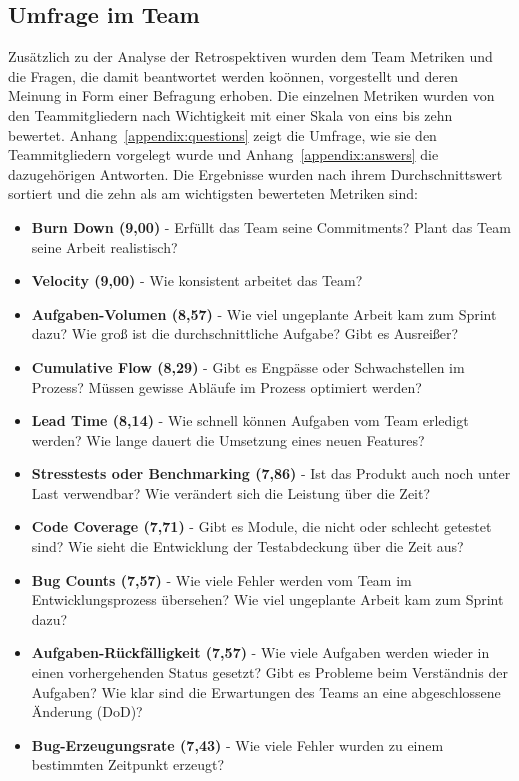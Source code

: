 \subsection{Umfrage im Team}

Zusätzlich zu der Analyse der Retrospektiven wurden dem Team Metriken und die Fragen, die damit beantwortet werden koönnen, vorgestellt und deren Meinung in Form einer Befragung erhoben.
Die einzelnen Metriken wurden von den Teammitgliedern nach Wichtigkeit mit einer Skala von eins bis zehn bewertet.
Anhang~\ref{appendix:questions} zeigt die Umfrage, wie sie den Teammitgliedern vorgelegt wurde und Anhang~\ref{appendix:answers} die dazugehörigen Antworten.
Die Ergebnisse wurden nach ihrem Durchschnittswert sortiert und die zehn als am wichtigsten bewerteten Metriken sind:

\begin{itemize}[noitemsep]
    \item \textbf{Burn Down (9,00)} \mbox{-} Erfüllt das Team seine Commitments? Plant das Team seine Arbeit realistisch?
    \item \textbf{Velocity (9,00)} \mbox{-} Wie konsistent arbeitet das Team?
    \item \textbf{Aufgaben-Volumen (8,57)} \mbox{-} Wie viel ungeplante Arbeit kam zum Sprint dazu? Wie groß ist die durchschnittliche Aufgabe? Gibt es Ausreißer?
    \item \textbf{Cumulative Flow (8,29)} \mbox{-} Gibt es Engpässe oder Schwachstellen im Prozess? Müssen gewisse Abläufe im Prozess optimiert werden?
    \item \textbf{Lead Time (8,14)} \mbox{-} Wie schnell können Aufgaben vom Team erledigt werden? Wie lange dauert die Umsetzung eines neuen Features?
    \item \textbf{Stresstests oder Benchmarking (7,86)} \mbox{-} Ist das Produkt auch noch unter Last verwendbar? Wie verändert sich die Leistung über die Zeit?
    \item \textbf{Code Coverage (7,71)} \mbox{-} Gibt es Module, die nicht oder schlecht getestet sind? Wie sieht die Entwicklung der Testabdeckung über die Zeit aus?
    \item \textbf{Bug Counts (7,57)} \mbox{-} Wie viele Fehler werden vom Team im Entwicklungsprozess übersehen? Wie viel ungeplante Arbeit kam zum Sprint dazu?
    \item \textbf{Aufgaben-Rückfälligkeit (7,57)} \mbox{-} Wie viele Aufgaben werden wieder in einen vorhergehenden Status gesetzt? Gibt es Probleme beim Verständnis der Aufgaben? Wie klar sind die Erwartungen des Teams an eine abgeschlossene Änderung (DoD)?
    \item \textbf{Bug-Erzeugungsrate (7,43)} \mbox{-} Wie viele Fehler wurden zu einem bestimmten Zeitpunkt erzeugt?
\end{itemize}


